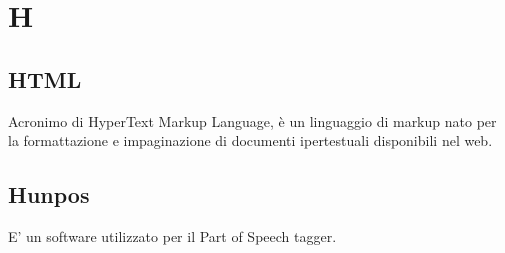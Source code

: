 \section*{H}

\subsection{HTML}
Acronimo di HyperText Markup Language,  è un linguaggio di markup nato per la formattazione e impaginazione di documenti ipertestuali disponibili nel web.

\subsection{Hunpos}
E' un software utilizzato per il Part of Speech tagger.